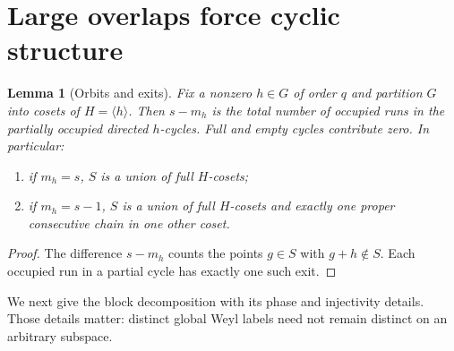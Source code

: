 \documentclass[11pt,a4paper]{article}
\newtheorem{lemma}[theorem]{Lemma}
\theoremstyle{remark}\newtheorem{remark}[theorem]{Remark}
\begin{document}
\section{Large overlaps force cyclic structure}
\begin{lemma}[Orbits and exits]\label{lem:exits}
Fix a nonzero $h\in G$ of order $q$ and partition $G$ into cosets of $H=\langle h\rangle$. Then $s-m_h$ is the total number of occupied runs in the partially occupied directed $h$-cycles. Full and empty cycles contribute zero. In particular:
\begin{enumerate}
\item if $m_h=s$, $S$ is a union of full $H$-cosets;
\item if $m_h=s-1$, $S$ is a union of full $H$-cosets and exactly one proper consecutive chain in one other coset.
\end{enumerate}
\end{lemma}
\begin{proof}
The difference $s-m_h$ counts the points $g\in S$ with $g+h\notin S$. Each occupied run in a partial cycle has exactly one such exit.
\end{proof}

We next give the block decomposition with its phase and injectivity details. Those details matter: distinct global Weyl labels need not remain distinct on an arbitrary subspace.
\end{document}
